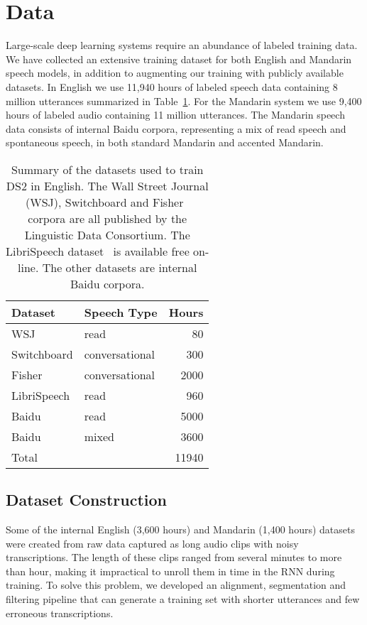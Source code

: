 \section{Data}
\label{sec:scaling_asr:data}

Large-scale deep learning systems require an abundance of labeled training
data. We have collected an extensive training dataset for both English and
Mandarin speech models, in addition to augmenting our training with publicly
available datasets. In English we use 11,940 hours of labeled speech data
containing 8 million utterances summarized in
Table~\ref{table:scaling_asr:englishdata}.  For the Mandarin system we use
9,400 hours of labeled audio containing 11 million utterances. The Mandarin
speech data consists of internal Baidu corpora, representing a mix of read
speech and spontaneous speech, in both standard Mandarin and accented Mandarin.

\begin{table}
\centering
\begin{tabular}{l l r}
 \toprule
 Dataset & Speech Type & Hours \\
 \midrule
 WSJ          & read           &   80  \\
 Switchboard  & conversational &  300  \\
 Fisher       & conversational & 2000  \\
 LibriSpeech  & read           &  960  \\
 Baidu        & read           & 5000  \\
 Baidu        & mixed          & 3600  \\
 \midrule
 Total       &                &  11940 \\
 \bottomrule
\end{tabular}
\caption{Summary of the datasets used to train DS2 in English. The Wall Street
        Journal (WSJ), Switchboard and Fisher~\cite{cieri2004fisher} corpora are
        all published by the Linguistic Data Consortium. The LibriSpeech
        dataset~\cite{panayotov2015} is available free on-line. The other datasets
        are internal Baidu corpora.}
\label{table:scaling_asr:englishdata}
\end{table}


\subsection{Dataset Construction}

Some of the internal English (3,600 hours) and Mandarin (1,400 hours) datasets
were created from raw data captured as long audio clips with noisy
transcriptions. The length of these clips ranged from several minutes to more
than hour, making it impractical to unroll them in time in the RNN during
training. To solve this problem, we developed an alignment, segmentation and
filtering pipeline that can generate a training set with shorter utterances and
few erroneous transcriptions.

